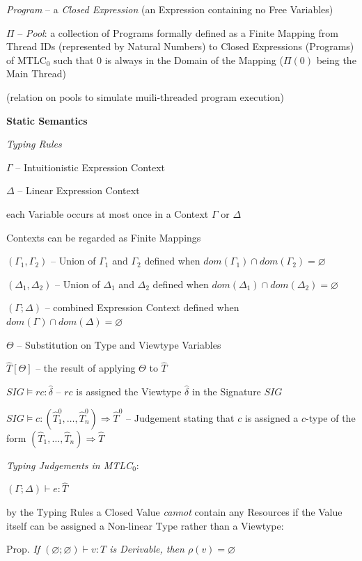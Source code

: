 \emph{Program} -- a \emph{Closed Expression} (an Expression containing
no Free Variables)

$\Pi$ -- \emph{Pool}: a collection of Programs formally defined as a
Finite Mapping from Thread IDs (represented by Natural Numbers) to
Closed Expressions (Programs) of MTLC$_0$ such that $0$ is always in
the Domain of the Mapping ($\Pi(0)$ being the Main Thread)

(relation on pools to simulate muili-threaded program execution) %


\textbf{Static Semantics}

\emph{Typing Rules}


$\Gamma$ -- Intuitionistic Expression Context

$\Delta$ -- Linear Expression Context

each Variable occurs at most once in a Context $\Gamma$ or $\Delta$

Contexts can be regarded as Finite Mappings

$(\Gamma_1, \Gamma_2)$ -- Union of $\Gamma_1$ and $\Gamma_2$ defined
when $dom(\Gamma_1) \cap dom(\Gamma_2) = \varnothing$

$(\Delta_1, \Delta_2)$ -- Union of $\Delta_1$ and $\Delta_2$ defined
when $dom(\Delta_1) \cap dom(\Delta_2) = \varnothing$

$(\Gamma;\Delta)$ -- combined Expression Context defined when
$dom(\Gamma) \cap dom(\Delta) = \varnothing$

$\Theta$ -- Substitution on Type and Viewtype Variables %

$\hat{T}[\Theta]$ -- the result of applying $\Theta$ to $\hat{T}$

$SIG \vDash rc : \hat{\delta}$ -- $rc$ is assigned the Viewtype
$\hat{\delta}$ in the Signature $SIG$

$SIG \vDash c : (\hat{T}^0_1, \ldots, \hat{T}^0_n) \Rightarrow
\hat{T}^0$ -- Judgement stating that $c$ is assigned a $c$-type of the
form $(\hat{T}_1, \ldots, \hat{T}_n) \Rightarrow \hat{T}$

\emph{Typing Judgements in MTLC$_0$}:

$(\Gamma;\Delta) \vdash e : \hat{T}$

by the Typing Rules a Closed Value \emph{cannot} contain any Resources
if the Value itself can be assigned a Non-linear Type rather than a
Viewtype:

Prop. \emph{If $(\varnothing;\varnothing) \vdash v : T$ is Derivable,
  then $\rho(v) = \varnothing$}

